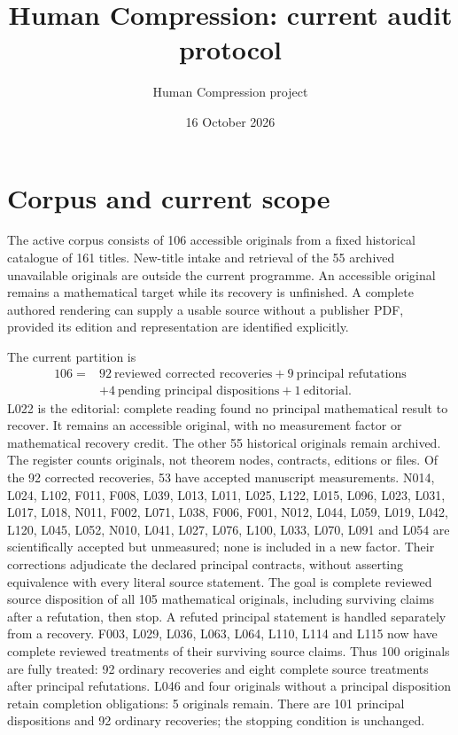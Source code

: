 \documentclass[11pt,a4paper]{article}
\title{Human Compression: current audit protocol}
\author{Human Compression project}
\date{16 October 2026}
\begin{document}
\maketitle

\section{Corpus and current scope}

The active corpus consists of 106 accessible originals from a fixed historical
catalogue of 161 titles. New-title intake and retrieval of the 55 archived
unavailable originals are outside the current programme. An accessible original
remains a mathematical target while its recovery is unfinished. A complete
authored rendering can supply a usable source without a publisher PDF, provided
its edition and representation are identified explicitly.

The current partition is
\[
\begin{aligned}
106={}&92\ \text{reviewed corrected recoveries}+9\ \text{principal refutations}\\
      &+4\ \text{pending principal dispositions}+1\ \text{editorial}.
\end{aligned}
\]
L022 is the editorial: complete reading found no principal mathematical result
to recover. It remains an accessible original, with no measurement factor or
mathematical recovery credit. The other 55 historical originals remain archived.
The register counts originals, not theorem nodes, contracts, editions or files.
Of the 92 corrected recoveries, 53 have accepted manuscript measurements.
N014, L024, L102, F011, F008, L039, L013, L011, L025, L122, L015, L096, L023, L031, L017, L018, N011, F002, L071, L038, F006, F001, N012, L044, L059, L019, L042, L120, L045, L052, N010, L041, L027, L076, L100, L033, L070, L091 and L054 are scientifically accepted but unmeasured; none is included
in a new factor. Their corrections adjudicate the declared principal contracts,
without asserting equivalence with every literal source statement. The goal
is complete reviewed source disposition of all 105 mathematical originals,
including surviving claims after a refutation, then stop. A refuted principal
statement is handled separately from a recovery. F003, L029, L036, L063, L064, L110, L114 and L115 now have complete reviewed
treatments of their surviving source claims. Thus 100 originals are fully
treated: 92 ordinary recoveries and eight complete source treatments after
principal refutations. L046 and four originals without a principal disposition
retain completion obligations: 5 originals remain. There are 101 principal
dispositions and 92 ordinary recoveries; the stopping condition is unchanged.
\end{document}
